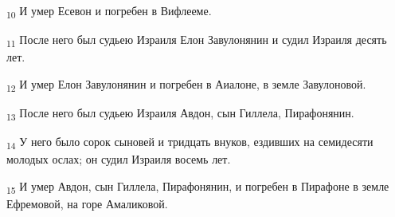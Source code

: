 \begin{tcolorbox}
\textsubscript{10} И умер Есевон и погребен в Вифлееме.
\end{tcolorbox}
\begin{tcolorbox}
\textsubscript{11} После него был судьею Израиля Елон Завулонянин и судил Израиля десять лет.
\end{tcolorbox}
\begin{tcolorbox}
\textsubscript{12} И умер Елон Завулонянин и погребен в Аиалоне, в земле Завулоновой.
\end{tcolorbox}
\begin{tcolorbox}
\textsubscript{13} После него был судьею Израиля Авдон, сын Гиллела, Пирафонянин.
\end{tcolorbox}
\begin{tcolorbox}
\textsubscript{14} У него было сорок сыновей и тридцать внуков, ездивших на семидесяти молодых ослах; он судил Израиля восемь лет.
\end{tcolorbox}
\begin{tcolorbox}
\textsubscript{15} И умер Авдон, сын Гиллела, Пирафонянин, и погребен в Пирафоне в земле Ефремовой, на горе Амаликовой.
\end{tcolorbox}
